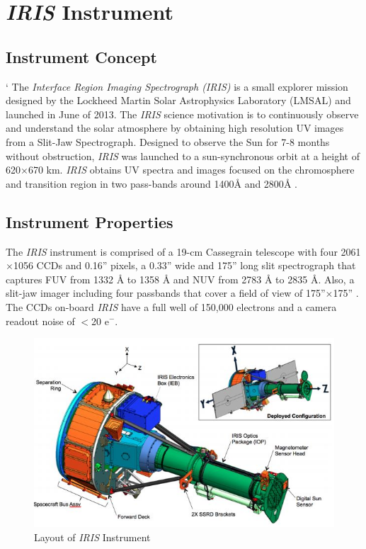 \documentclass[10pt,a4paper,titlepage]{article}
\begin{document}
			
	\section{\textit{IRIS} Instrument}
		\subsection{Instrument Concept}`
			 The \textit{Interface Region Imaging Spectrograph (IRIS)} is a small explorer mission designed by the Lockheed Martin Solar Astrophysics Laboratory (LMSAL) and launched in June of 2013. The \textit{IRIS} science motivation is to continuously observe and understand the solar atmosphere by obtaining high resolution UV images from a Slit-Jaw Spectrograph. Designed to observe the Sun for 7-8 months without obstruction, \textit{IRIS} was launched to a sun-synchronous orbit at a height of 620$\times$670 km. \textit{IRIS} obtains UV spectra and images focused on the chromosphere and transition region in two pass-bands around 1400{\AA} and 2800{\AA} \cite{ITN1}.
			 
		\subsection{Instrument Properties}
			The \textit{IRIS} instrument is comprised of a 19-cm  Cassegrain telescope with four 2061$\times$1056 CCDs and 0.16'' pixels, a 0.33'' wide and 175'' long slit spectrograph that captures FUV from 1332 {\AA} to 1358 {\AA} and NUV from 2783 {\AA} to 2835 {\AA}. Also, a slit-jaw imager including four passbands that cover a field of view of 175''$\times$175'' \cite{IRIS}. The CCDs on-board \textit{IRIS}  have a full well of 150,000 electrons and a camera readout noise of $<$20 e$^-$. 
			
				\begin{figure}[H]
					\includegraphics[scale=0.6]{iris}
					\centering
					\caption{Layout of \textit{IRIS} Instrument}
					\centering
				\end{figure}
		
\end{document}
